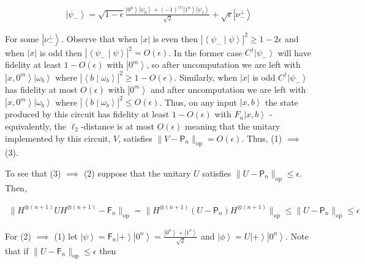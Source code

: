 \documentclass[10pt,a4paper]{article}
\begin{document}
\[\begin{gathered}
\displaystyle\left|\psi_{-}\right\rangle \displaystyle=\sqrt{1-\epsilon}\frac{\left|0^{n}\right\rangle\left|\psi_{0}\right\rangle+(-1)^{|x|}\left|1^{n}\right\rangle\left|\psi_{1}\right\rangle}{\sqrt{2}}+\sqrt{\epsilon}\left|\nu_{-}^{\perp}\right\rangle
\end{gathered}\]


For some $\left|\nu^{\perp}_{-}\right\rangle$. Observe that when $|x|$ is even then $|\left\langle\psi_{-}\middle|\psi\right\rangle|^{2}\geq 1-2\epsilon$ and when $|x|$ is odd then $|\left\langle\psi_{-}\middle|\psi\right\rangle|^{2}=O(\epsilon)$. In the former case $C^{{\dagger}}\left|\psi_{-}\right\rangle$ will have fidelity at least $1-O(\epsilon)$ with $\left|0^{m}\right\rangle$, so after uncomputation we are left with $\left|x,0^{m}\right\rangle\left|\omega_{b}\right\rangle$ where $|\left\langle b\middle|\omega_{b}\right\rangle|^{2}\geq 1-O(\epsilon)$. Similarly, when $|x|$ is odd $C^{{\dagger}}\left|\psi_{-}\right\rangle$ has fidelity at most $O(\epsilon)$ with $\left|0^{m}\right\rangle$ and after uncomputation we are left with $\left|x,0^{m}\right\rangle\left|\omega_{b}\right\rangle$ where $|\left\langle b\middle|\omega_{b}\right\rangle|^{2}\leq O(\epsilon)$. Thus, on any input $\left|x,b\right\rangle$ the state produced by this circuit has fidelity at least $1-O(\epsilon)$ with $F_{n}\left|x,b\right\rangle$ - equivalently, the $\ell_{2}$-distance is at most $O(\epsilon)$ meaning that the unitary implemented by this circuit, $V$, satisfies $\|V-\mathsf{P}_{n}\|_{\mathrm{op}}=O(\epsilon)$. Thus, (1) $\implies$ (3).\par




To see that (3) $\implies$ (2) suppose that the unitary $U$ satisfies $\|U-\mathsf{P}_{n}\|_{\mathrm{op}}\leq\epsilon$. Then,\par


\[\begin{gathered}
\displaystyle\|H^{\otimes(n+1)}UH^{\otimes(n+1)}-\mathsf{F}_{n}\|_{\mathrm{op}} \displaystyle=\|H^{\otimes(n+1)}(U-\mathsf{P}_{n})H^{\otimes(n+1)}\|_{\mathrm{op}}\leq\|U-\mathsf{P}_{n}\|_{\mathrm{op}}\leq\epsilon
\end{gathered}\]


For (2) $\implies$ (1) let $\left|\psi\right\rangle=\mathsf{F}_{n}\left|+\right\rangle\left|0^{n}\right\rangle=\frac{\left|0^{n}\right\rangle+\left|1^{n}\right\rangle}{\sqrt{2}}$ and $\left|\phi\right\rangle=U\left|+\right\rangle\left|0^{n}\right\rangle$. Note that if $\|U-\mathsf{F}_{n}\|_{\mathrm{op}}\leq\epsilon$ then\par
\end{document}
